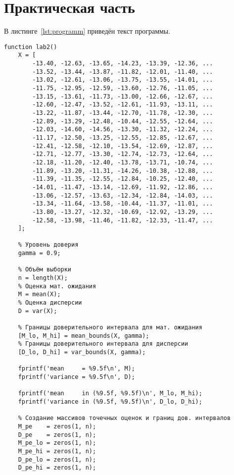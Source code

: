 \chapter{Практическая часть}

\lstset{language=matlab}

В листинге~\ref{lst:programm} приведён текст программы.
\begin{lstlisting}[caption={Текст программы},label={lst:programm}]
function lab2()
    X = [
        -13.40, -12.63, -13.65, -14.23, -13.39, -12.36, ...
        -13.52, -13.44, -13.87, -11.82, -12.01, -11.40, ...
        -13.02, -12.61, -13.06, -13.75, -13.55, -14.01, ...
        -11.75, -12.95, -12.59, -13.60, -12.76, -11.05, ...
        -13.15, -13.61, -11.73, -13.00, -12.66, -12.67, ...
        -12.60, -12.47, -13.52, -12.61, -11.93, -13.11, ...
        -13.22, -11.87, -13.44, -12.70, -11.78, -12.30, ...
        -12.89, -13.29, -12.48, -10.44, -12.55, -12.64, ...
        -12.03, -14.60, -14.56, -13.30, -11.32, -12.24, ...
        -11.17, -12.50, -13.25, -12.55, -12.85, -12.67, ...
        -12.41, -12.58, -12.10, -13.54, -12.69, -12.87, ...
        -12.71, -12.77, -13.30, -12.74, -12.73, -12.64, ...
        -12.18, -11.20, -12.40, -13.78, -13.71, -10.74, ...
        -11.89, -13.20, -11.31, -14.26, -10.38, -12.88, ...
        -11.39, -11.35, -12.55, -12.84, -10.25, -12.40, ...
        -14.01, -11.47, -13.14, -12.69, -11.92, -12.86, ...
        -13.06, -12.57, -13.63, -12.34, -12.84, -14.03, ...
        -13.34, -11.64, -13.58, -10.44, -11.37, -11.01, ...
        -13.80, -13.27, -12.32, -10.69, -12.92, -13.29, ...
        -12.58, -13.98, -11.46, -11.82, -12.33, -11.47, ...
    ];

    % Уровень доверия
    gamma = 0.9;

    % Объём выборки
    n = length(X);
    % Оценка мат. ожидания
    M = mean(X);
    % Оценка дисперсии
    D = var(X);

    % Границы доверительного интервала для мат. ожидания
    [M_lo, M_hi] = mean_bounds(X, gamma);
    % Границы доверительного интервала для дисперсии
    [D_lo, D_hi] = var_bounds(X, gamma);

    fprintf('mean     = %9.5f\n', M);
    fprintf('variance = %9.5f\n', D);

    fprintf('mean     in (%9.5f, %9.5f)\n', M_lo, M_hi);
    fprintf('variance in (%9.5f, %9.5f)\n', D_lo, D_hi);

    % Создание массивов точечных оценок и границ дов. интервалов
    M_pe    = zeros(1, n);
    D_pe    = zeros(1, n);
    M_pe_lo = zeros(1, n);
    M_pe_hi = zeros(1, n);
    D_pe_lo = zeros(1, n);
    D_pe_hi = zeros(1, n);


\end{lstlisting}
